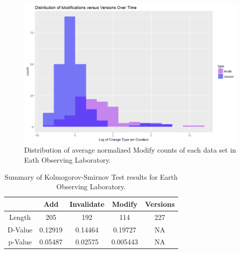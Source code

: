 \begin{figure}%
	\centering
	\includegraphics[scale=.6]{figures/Eol_Mod_Ver_Rate.png}
	\caption{Distribution of average normalized Modify counts of each data set in Eath Observing Laboratory.}
	\label{EOL_Mod_Ver}
\end{figure}

\begin{table}
	\caption{Summary of Kolmogorov-Smirnov Test results for Earth Observing Laboratory.}
	\label{table:Eol_KS}
	\centering
	\begin{tabular}{|c|c|c|c|c|}
		\hline
		&	Add&	Invalidate&	Modify&	Versions\\ \hline
		Length&	205&	192&	114&	227\\
		D-Value&	0.12919&	0.14464&	0.19727&	NA\\
		p-Value&	0.05487&	0.02575&	0.005443&	NA\\
		\hline
	\end{tabular}
\end{table}

